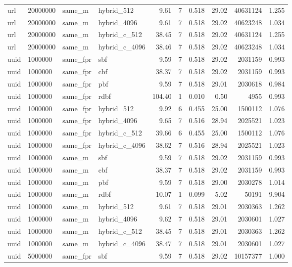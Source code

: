 \begin{tabular}{llllrrrrrr}
url & 20000000 & same\_m & hybrid\_512 & 9.61 & 7 & 0.518 & 29.02 & 40631124 & 1.255 \\
url & 20000000 & same\_m & hybrid\_4096 & 9.61 & 7 & 0.518 & 29.02 & 40623248 & 1.034 \\
url & 20000000 & same\_m & hybrid\_c\_512 & 38.45 & 7 & 0.518 & 29.02 & 40631124 & 1.255 \\
url & 20000000 & same\_m & hybrid\_c\_4096 & 38.46 & 7 & 0.518 & 29.02 & 40623248 & 1.034 \\
uuid & 1000000 & same\_fpr & sbf & 9.59 & 7 & 0.518 & 29.02 & 2031159 & 0.993 \\
uuid & 1000000 & same\_fpr & cbf & 38.37 & 7 & 0.518 & 29.02 & 2031159 & 0.993 \\
uuid & 1000000 & same\_fpr & pbf & 9.59 & 7 & 0.518 & 29.01 & 2030618 & 0.984 \\
uuid & 1000000 & same\_fpr & rdbf & 104.40 & 1 & 0.010 & 0.50 & 4955 & 0.993 \\
uuid & 1000000 & same\_fpr & hybrid\_512 & 9.92 & 6 & 0.455 & 25.00 & 1500112 & 1.076 \\
uuid & 1000000 & same\_fpr & hybrid\_4096 & 9.65 & 7 & 0.516 & 28.94 & 2025521 & 1.023 \\
uuid & 1000000 & same\_fpr & hybrid\_c\_512 & 39.66 & 6 & 0.455 & 25.00 & 1500112 & 1.076 \\
uuid & 1000000 & same\_fpr & hybrid\_c\_4096 & 38.62 & 7 & 0.516 & 28.94 & 2025521 & 1.023 \\
uuid & 1000000 & same\_m & sbf & 9.59 & 7 & 0.518 & 29.02 & 2031159 & 0.993 \\
uuid & 1000000 & same\_m & cbf & 38.37 & 7 & 0.518 & 29.02 & 2031159 & 0.993 \\
uuid & 1000000 & same\_m & pbf & 9.59 & 7 & 0.518 & 29.00 & 2030278 & 1.014 \\
uuid & 1000000 & same\_m & rdbf & 10.07 & 1 & 0.099 & 5.02 & 50191 & 9.904 \\
uuid & 1000000 & same\_m & hybrid\_512 & 9.61 & 7 & 0.518 & 29.01 & 2030363 & 1.262 \\
uuid & 1000000 & same\_m & hybrid\_4096 & 9.62 & 7 & 0.518 & 29.01 & 2030601 & 1.027 \\
uuid & 1000000 & same\_m & hybrid\_c\_512 & 38.45 & 7 & 0.518 & 29.01 & 2030363 & 1.262 \\
uuid & 1000000 & same\_m & hybrid\_c\_4096 & 38.47 & 7 & 0.518 & 29.01 & 2030601 & 1.027 \\
uuid & 5000000 & same\_fpr & sbf & 9.59 & 7 & 0.518 & 29.02 & 10157377 & 1.000 \\

\end{tabular}
